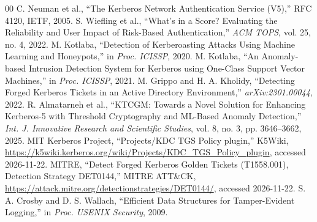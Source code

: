 \documentclass[conference]{IEEEtran}
\begin{document}
\begin{thebibliography}{00}
 C. Neuman et al., ``The Kerberos Network Authentication Service (V5),'' RFC 4120, IETF, 2005.
 S. Wiefling et al., ``What's in a Score? Evaluating the Reliability and User Impact of Risk-Based Authentication,'' \textit{ACM TOPS}, vol. 25, no. 4, 2022.
 M. Kotlaba, ``Detection of Kerberoasting Attacks Using Machine Learning and Honeypots,'' in \textit{Proc. ICISSP}, 2020.
 M. Kotlaba, ``An Anomaly-based Intrusion Detection System for Kerberos using One-Class Support Vector Machines,'' in \textit{Proc. ICISSP}, 2021.
 M. Grippo and H. A. Kholidy, ``Detecting Forged Kerberos Tickets in an Active Directory Environment,'' \textit{arXiv:2301.00044}, 2022.
 R. Almatarneh et al., ``KTCGM: Towards a Novel Solution for Enhancing Kerberos-5 with Threshold Cryptography and ML-Based Anomaly Detection,'' \textit{Int. J. Innovative Research and Scientific Studies}, vol. 8, no. 3, pp. 3646--3662, 2025.
 MIT Kerberos Project, ``Projects/KDC TGS Policy plugin,'' K5Wiki, \url{https://k5wiki.kerberos.org/wiki/Projects/KDC_TGS_Policy_plugin}, accessed 2026-11-22.
 MITRE, ``Detect Forged Kerberos Golden Tickets (T1558.001), Detection Strategy DET0144,'' MITRE ATT\&CK, \url{https://attack.mitre.org/detectionstrategies/DET0144/}, accessed 2026-11-22.
 S. A. Crosby and D. S. Wallach, ``Efficient Data Structures for Tamper-Evident Logging,'' in \textit{Proc. USENIX Security}, 2009.
\end{thebibliography}
\end{document}
